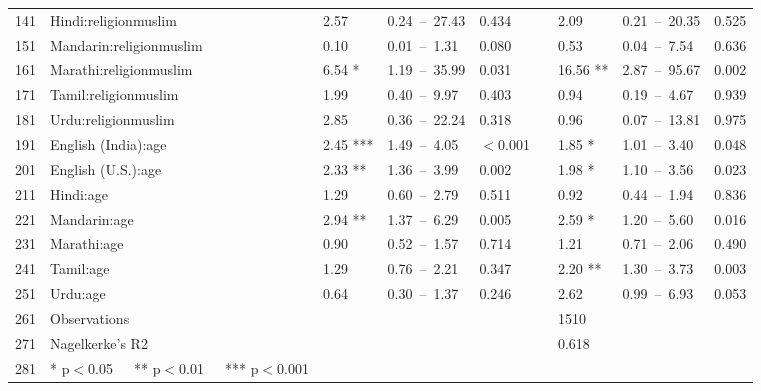 \begin{table}[ht]
\begin{tabular}{}
  141 & Hindi:religionmuslim & 2.57 & 0.24 – 27.43 & 0.434 &  & 2.09 & 0.21 – 20.35 & 0.525 \\ 
  151 & Mandarin:religionmuslim & 0.10 & 0.01 – 1.31 & 0.080 &  & 0.53 & 0.04 – 7.54 & 0.636 \\ 
  161 & Marathi:religionmuslim & 6.54 * & 1.19 – 35.99 & 0.031 &  & 16.56 ** & 2.87 – 95.67 & 0.002 \\ 
  171 & Tamil:religionmuslim & 1.99 & 0.40 – 9.97 & 0.403 &  & 0.94 & 0.19 – 4.67 & 0.939 \\ 
  181 & Urdu:religionmuslim & 2.85 & 0.36 – 22.24 & 0.318 &  & 0.96 & 0.07 – 13.81 & 0.975 \\ 
  191 & English (India):age & 2.45 *** & 1.49 – 4.05 & $<$0.001 &  & 1.85 * & 1.01 – 3.40 & 0.048 \\ 
  201 & English (U.S.):age & 2.33 ** & 1.36 – 3.99 & 0.002 &  & 1.98 * & 1.10 – 3.56 & 0.023 \\ 
  211 & Hindi:age & 1.29 & 0.60 – 2.79 & 0.511 &  & 0.92 & 0.44 – 1.94 & 0.836 \\ 
  221 & Mandarin:age & 2.94 ** & 1.37 – 6.29 & 0.005 &  & 2.59 * & 1.20 – 5.60 & 0.016 \\ 
  231 & Marathi:age & 0.90 & 0.52 – 1.57 & 0.714 &  & 1.21 & 0.71 – 2.06 & 0.490 \\ 
  241 & Tamil:age & 1.29 & 0.76 – 2.21 & 0.347 &  & 2.20 ** & 1.30 – 3.73 & 0.003 \\ 
  251 & Urdu:age & 0.64 & 0.30 – 1.37 & 0.246 &  & 2.62 & 0.99 – 6.93 & 0.053 \\ 
  261 & Observations &  &  &  &  & 1510 &  &  \\ 
  271 & Nagelkerke's R2 &  &  &  &  & 0.618 &  &  \\ 
  281 & * p$<$0.05   ** p$<$0.01   *** p$<$0.001 &  &  &  &  &  &  &  \\ 
   \hline
\end{tabular}
\end{table}
